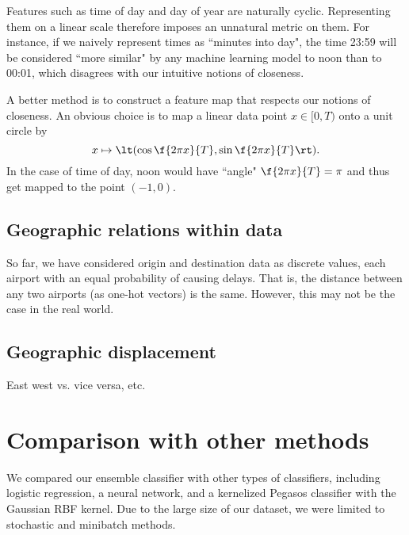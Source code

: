 \documentclass{article}
\begin{document}
\begin{multicols}{2}
Features such as time of day and day of year
are naturally cyclic.
Representing them on a linear scale
therefore imposes an unnatural metric on them.
For instance,
if we naively represent times as ``minutes into day",
the time 23:59 will be considered ``more similar"
by any machine learning model to noon than to 00:01,
which disagrees with our intuitive notions of closeness.

A better method is to construct a feature map
that respects our notions of closeness.
An obvious choice is to map a linear data point $x \in [0, T)$
onto a unit circle by
\begin{equation}
    x \mapsto \lt(\cos\f{2\pi x}{T}, \sin\f{2\pi x}{T}\rt).
\end{equation}
In the case of time of day,
noon would have ``angle" $\f{2\pi x}{T} = \pi$
and thus get mapped to the point $(-1, 0)$.


\subsection{Geographic relations within data}

So far, we have considered origin and destination data
as discrete values,
each airport with an equal probability of causing delays.
That is, the distance between any two airports
(as one-hot vectors) is the same.
However, this may not be the case in the real world.

\subsection{Geographic displacement}

East west vs. vice versa, etc.

\section{Comparison with other methods}

We compared our ensemble classifier
with other types of classifiers,
including logistic regression, a neural network,
and a kernelized Pegasos classifier
with the Gaussian RBF kernel.
Due to the large size of our dataset,
we were limited to
stochastic and minibatch methods.

\end{multicols}
\end{document}
